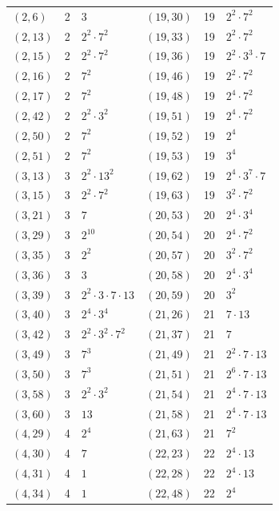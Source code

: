 \documentclass[11pt]{article}
\begin{document}
\begin{longtable}{@{}lrl@{\qquad}lrl@{}}
$(2,6)$ & 2 & $3$ & $(19,30)$ & 19 & $2^{2}\cdot 7^{2}$\\
$(2,13)$ & 2 & $2^{2}\cdot 7^{2}$ & $(19,33)$ & 19 & $2^{2}\cdot 7^{2}$\\
$(2,15)$ & 2 & $2^{2}\cdot 7^{2}$ & $(19,36)$ & 19 & $2^{2}\cdot 3^{3}\cdot 7$\\
$(2,16)$ & 2 & $7^{2}$ & $(19,46)$ & 19 & $2^{2}\cdot 7^{2}$\\
$(2,17)$ & 2 & $7^{2}$ & $(19,48)$ & 19 & $2^{4}\cdot 7^{2}$\\
$(2,42)$ & 2 & $2^{2}\cdot 3^{2}$ & $(19,51)$ & 19 & $2^{4}\cdot 7^{2}$\\
$(2,50)$ & 2 & $7^{2}$ & $(19,52)$ & 19 & $2^{4}$\\
$(2,51)$ & 2 & $7^{2}$ & $(19,53)$ & 19 & $3^{4}$\\
$(3,13)$ & 3 & $2^{2}\cdot 13^{2}$ & $(19,62)$ & 19 & $2^{4}\cdot 3^{7}\cdot 7$\\
$(3,15)$ & 3 & $2^{2}\cdot 7^{2}$ & $(19,63)$ & 19 & $3^{2}\cdot 7^{2}$\\
$(3,21)$ & 3 & $7$ & $(20,53)$ & 20 & $2^{4}\cdot 3^{4}$\\
$(3,29)$ & 3 & $2^{10}$ & $(20,54)$ & 20 & $2^{4}\cdot 7^{2}$\\
$(3,35)$ & 3 & $2^{2}$ & $(20,57)$ & 20 & $3^{2}\cdot 7^{2}$\\
$(3,36)$ & 3 & $3$ & $(20,58)$ & 20 & $2^{4}\cdot 3^{4}$\\
$(3,39)$ & 3 & $2^{2}\cdot 3\cdot 7\cdot 13$ & $(20,59)$ & 20 & $3^{2}$\\
$(3,40)$ & 3 & $2^{4}\cdot 3^{4}$ & $(21,26)$ & 21 & $7\cdot 13$\\
$(3,42)$ & 3 & $2^{2}\cdot 3^{2}\cdot 7^{2}$ & $(21,37)$ & 21 & $7$\\
$(3,49)$ & 3 & $7^{3}$ & $(21,49)$ & 21 & $2^{2}\cdot 7\cdot 13$\\
$(3,50)$ & 3 & $7^{3}$ & $(21,51)$ & 21 & $2^{6}\cdot 7\cdot 13$\\
$(3,58)$ & 3 & $2^{2}\cdot 3^{2}$ & $(21,54)$ & 21 & $2^{4}\cdot 7\cdot 13$\\
$(3,60)$ & 3 & $13$ & $(21,58)$ & 21 & $2^{4}\cdot 7\cdot 13$\\
$(4,29)$ & 4 & $2^{4}$ & $(21,63)$ & 21 & $7^{2}$\\
$(4,30)$ & 4 & $7$ & $(22,23)$ & 22 & $2^{4}\cdot 13$\\
$(4,31)$ & 4 & $1$ & $(22,28)$ & 22 & $2^{4}\cdot 13$\\
$(4,34)$ & 4 & $1$ & $(22,48)$ & 22 & $2^{4}$\\

\end{longtable}
\end{document}
